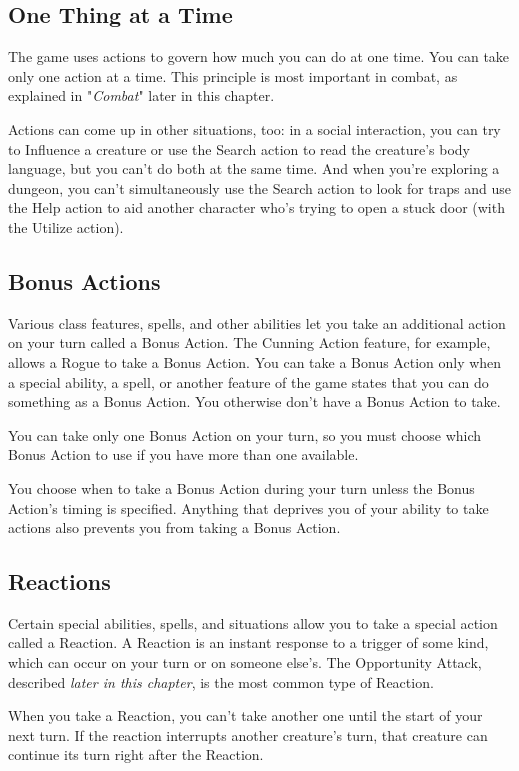 \documentclass[10pt,a4paper,twoside,bg=print,twocolumn,openany,nodeprecatedcode]{dndbook}
\begin{document}
\subsection{One Thing at a Time}
The game uses actions to govern how much you can do at one time. You can take only one action at a time. This principle is most important in combat, as explained in "\textit{Combat}" later in this chapter.

Actions can come up in other situations, too: in a social interaction, you can try to Influence a creature or use the Search action to read the creature's body language, but you can't do both at the same time. And when you're exploring a dungeon, you can't simultaneously use the Search action to look for traps and use the Help action to aid another character who's trying to open a stuck door (with the Utilize action).

\subsection{Bonus Actions}
Various class features, spells, and other abilities let you take an additional action on your turn called a Bonus Action. The Cunning Action feature, for example, allows a Rogue to take a Bonus Action. You can take a Bonus Action only when a special ability, a spell, or another feature of the game states that you can do something as a Bonus Action. You otherwise don't have a Bonus Action to take.

You can take only one Bonus Action on your turn, so you must choose which Bonus Action to use if you have more than one available.

You choose when to take a Bonus Action during your turn unless the Bonus Action's timing is specified. Anything that deprives you of your ability to take actions also prevents you from taking a Bonus Action.

\subsection{Reactions}
Certain special abilities, spells, and situations allow you to take a special action called a Reaction. A Reaction is an instant response to a trigger of some kind, which can occur on your turn or on someone else's. The Opportunity Attack, described \textit{later in this chapter}, is the most common type of Reaction.

When you take a Reaction, you can't take another one until the start of your next turn. If the reaction interrupts another creature's turn, that creature can continue its turn right after the Reaction.
\end{document}
